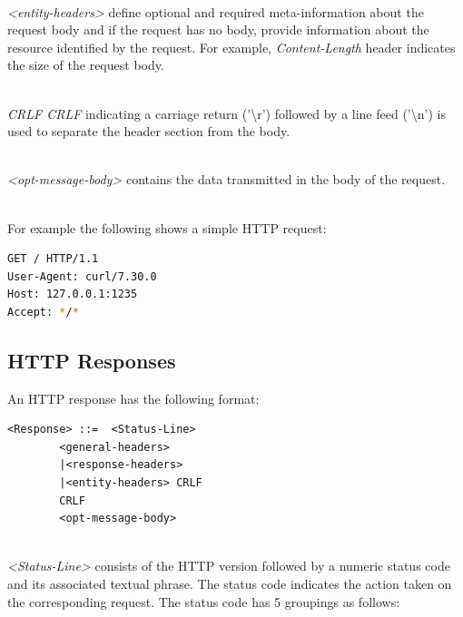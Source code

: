 \documentclass[a4paper,11pt,twoside]{report}
\begin{document}
\noindent\\
\textit{<entity-headers>} define optional and required meta-information about the request body and if the request has no body, provide information about the resource identified by the request. For example, \textit{Content-Length} header indicates the size of the request body. 

\noindent\\
\textit{CRLF CRLF} indicating a carriage return ('\textbackslash r') followed by a line feed ('\textbackslash n') is used to separate the header section from the body.

\noindent\\
\textit{<opt-message-body>} contains the data transmitted in the body of the request.

\noindent\\
For example the following shows a simple HTTP request:

\begin{lstlisting}[language=bash,xleftmargin=.25in,  xrightmargin=.25in]
GET / HTTP/1.1
User-Agent: curl/7.30.0
Host: 127.0.0.1:1235
Accept: */*
\end{lstlisting} 

\subsection{HTTP Responses}
An HTTP response has the following format:\bigskip

\begin{lstlisting}[language=terminal, xleftmargin=.3in,xrightmargin=2.25in]
<Response> ::=	<Status-Line>
		<general-headers>
		|<response-headers>
		|<entity-headers> CRLF
		CRLF 
		<opt-message-body>
\end{lstlisting} 
\noindent\\
\textit{<Status-Line>} consists of the HTTP version followed by a numeric status code and its associated textual phrase. The status code indicates the action taken on the corresponding request.  The status code has 5 groupings as follows:
\end{document}
